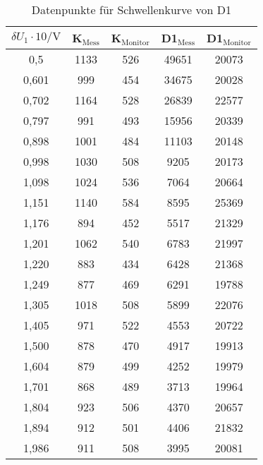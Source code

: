 \begin{table}[h]
    \centering
    \small
    \caption{Datenpunkte für Schwellenkurve von D1}
    \label{tab:schwelle_d1}
    \begin{tabular}{c c c c c}
      \toprule
      $\delta U_1 \cdot 10/\si{\volt}$ & K$_\mathrm{Mess}$ & K$_\mathrm{Monitor}$ & D1$_\mathrm{Mess}$ & D1$_\mathrm{Monitor}$ \\
      \midrule
      0,5    &         1133  &  526   &  49651 &  20073\\
      0,601  &         999   &  454   &  34675 &  20028\\
      0,702  &         1164  &  528   &  26839 &  22577\\
      0,797  &         991   &  493   &  15956 &  20339\\
      0,898  &         1001  &  484   &  11103 &  20148\\
      0,998  &         1030  &  508   &  9205  &  20173\\
      1,098  &         1024  &  536   &  7064  &  20664\\
      1,151  &	       1140  &	584   &	8595   &  25369\\
      1,176  &		894  &	452   &	5517   &  21329\\
      1,201  &         1062  &  540   &  6783  &  21997\\
      1,220  & 		883  &	434   &	6428   &  21368\\
      1,249  &		877  &	469   &	6291   &  19788\\
      1,305  &         1018  &  508   &  5899  &  22076\\
      1,405  &         971   &  522   &  4553  &  20722\\
      1,500  &         878   &  470   &  4917  &  19913\\
      1,604  &         879   &  499   &  4252  &  19979\\
      1,701  &         868   &  489   &  3713  &  19964\\
      1,804  &         923   &  506   &  4370  &  20657\\
      1,894  &         912   &  501   &  4406  &  21832\\
      1,986  &         911   &  508   &  3995  &  20081\\
      \bottomrule
    \end{tabular}
  \end{table}
